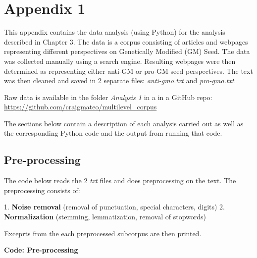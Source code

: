\chapter{Appendix 1}
This appendix contains the data analysis (using Python) for the analysis described in Chapter 3. The data is a corpus consisting of articles and webpages representing different perspectives on Genetically Modified (GM) Seed. The data was collected manually using a search engine. Resulting webpages were then determined as representing either anti-GM or pro-GM seed perspectives. The text was then cleaned and saved in 2 separate files: \textit{anti-gmo.txt} and \textit{pro-gmo.txt}.



Raw data is available in the folder \textit{Analysis 1} in a in a GitHub repo: \href{https://github.com/craigmateo/multilevel_corpus}{https://github.com/craigmateo/multilevel\_corpus}

The sections below contain a description of each analysis carried out as well as the corresponding Python code and the output from running that code. 

\section{Pre-processing}

The code below reads the 2 \textit{txt} files and does preprocessing on the text. The preprocessing consists of:

1. \textbf{Noise removal} (removal of punctuation, special characters, digits)
2. \textbf{Normalization} (stemming, lemmatization, removal of stopwords) 

Exceprts from the each preprocessed subcorpus are then printed.

\textbf{Code: Pre-processing}

